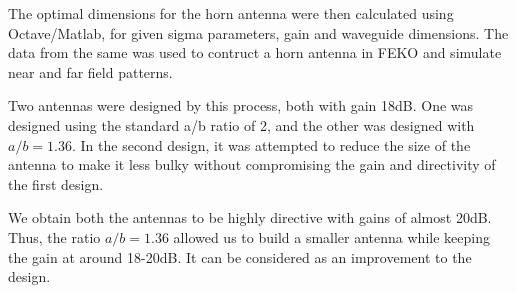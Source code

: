 \documentclass[12pt]{article}
\begin{document}
The optimal dimensions for the horn antenna were then calculated using Octave/Matlab, for given sigma parameters, gain and waveguide dimensions. The data from the same was used to contruct a horn antenna in FEKO and simulate near and far field patterns. \linebreak

Two antennas were designed by this process, both with gain 18dB. One was designed using the standard a/b ratio of 2, and the other was designed with $a/b=1.36$. In the second design, it was attempted to reduce the size of the antenna to make it less bulky without compromising the gain and directivity of the first design. \linebreak

We obtain both the antennas to be highly directive with gains of almost 20dB. Thus, the ratio $a/b=1.36$ allowed us to build a smaller antenna while keeping the gain at around 18-20dB. It can be considered as an improvement to the design.
\end{document}
